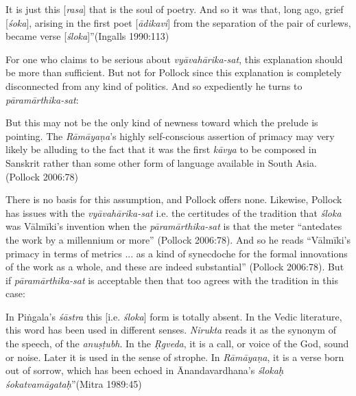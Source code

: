 \begin{myquote}
It is just this [\textsl{rasa}] that is the soul of poetry. And so it was that, long ago, grief [\textsl{śoka}], arising in the first poet [\textsl{ādikavi}] from the separation of the pair of curlews, became verse [\textsl{śloka}]''\hfill (Ingalls 1990:113)
\end{myquote}

For one who claims to be serious about \textsl{vyāvahārika-sat}, this explanation should be more than sufficient. But not for Pollock since this explanation is completely disconnected from any kind of politics. And so expediently he turns to \textsl{pāramārthika-sat}:  

\begin{myquote}
But this may not be the only kind of newness toward which the prelude is pointing. The \textsl{Rāmāyaṇa}'s highly self-conscious assertion of primacy may very likely be alluding to the fact that it was the first \textsl{kāvya} to be composed in Sanskrit rather than some other form of language available in South Asia. 
\hfill (Pollock 2006:78)
\end{myquote}

There is no basis for this assumption, and Pollock offers none. Likewise, Pollock has issues with the \textsl{vyāvahārika-sat} i.e. the certitudes of the tradition that \textsl{śloka} was Vālmīki's invention when the \textsl{pāramārthika-sat} is that the meter ``antedates the work by a millennium or more'' (Pollock 2006:78). And so he reads ``Vālmīki’s primacy in terms of metrics ... as a kind of synecdoche for the formal innovations of the work as a whole, and these are indeed substantial” (Pollock 2006:78). But if \textsl{pāramārthika-sat} is acceptable then that too agrees with the tradition in this case:

\begin{myquote}
In Piṅgala's \textsl{śāstra} this [i.e. \textsl{śloka}] form is totally absent. In the Vedic literature, this word has been used in different senses. \textsl{Nirukta} reads it as the synonym of the speech, of the \textsl{anuṣṭubh}. In the \textsl{Ṛgveda}, it is a call, or voice of the God, sound or noise. Later it is used in the sense of strophe. In \textsl{Rāmāyaṇa}, it is a verse born out of sorrow, which has been echoed in Ānandavardhana's \textsl{ślokaḥ śokatvamāgataḥ}''\hfill (Mitra 1989:45)
\end{myquote}


